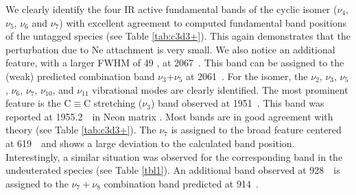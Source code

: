 

We clearly identify the four IR active fundamental bands of the cyclic isomer ($\nu_4$, $\nu_5$, $\nu_6$ and $\nu_7$) with excellent agreement to computed fundamental band positions of the untagged species (see Table \ref{tab:c3d3+}). This again demonstrates that the perturbation due to Ne attachment is very small. We also notice an additional feature, with a larger FWHM of 49 \wn, at 2067~\wnn. This band can be assigned to the (weak) predicted combination band $\nu_3$+$\nu_5$ at 2061~\wn.
For the \linD isomer, the $\nu_2$, $\nu_3$, $\nu_5$, $\nu_6$, $\nu_7$, $\nu_{10}$, and $\nu_{11}$ vibrational modes are clearly identified. The most prominent feature is the C$\equiv$C stretching ($\nu_3$) band observed at 1951~\wn. This band was reported at 1955.2~\wn\ in Neon matrix \citep{Wyss2001}. Most bands are in good agreement with theory (see Table \ref{tab:c3d3+}). The $\nu_7$ is assigned to the broad feature centered at 619~\wn\ and shows a large deviation to the calculated band position. Interestingly, a similar situation was observed for the corresponding band in the undeuterated species (see Table \ref{tbl1}). 
An additional band observed at 928~\wn\ is assigned to the $\nu_7+\nu_8$ combination band predicted at 914~\wnn.\\


